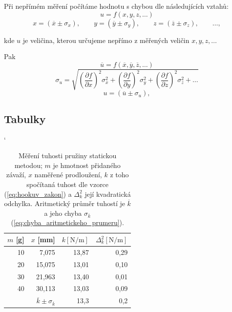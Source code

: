 \documentclass[english]{article}
\newcommand{\unit}[1]{\mathrm{#1}}
\begin{document}
	Při nepřímém měření počítáme hodnotu s chybou dle následujících vztahů:
	\begin{equation}
	u = f(x, y, z, \ldots)
	\end{equation}
	\begin{displaymath}
	x = (\overline{x} \pm \sigma_x), \qquad
	y = (\overline{y} \pm \sigma_y), \qquad
	z = (\overline{z} \pm \sigma_z), \qquad
	\ldots,
	\end{displaymath}
	
	kde $ u $ je veličina, kterou určujeme nepřímo z měřených veličin $ x, y, z, \ldots $ 
	
	Pak
	\begin{displaymath}
	\overline{u} = f(\overline{x}, \overline{y}, \overline{z}, \ldots)
	\end{displaymath}
	\begin{equation}\label{eq:chyba_neprime_mereni}
	\sigma_u = \sqrt{\left( \frac{\partial f}{\partial x} \right)^2 \sigma^2_x + \left( \frac{\partial f}{\partial y} \right)^2 \sigma^2_y + \left( \frac{\partial f}{\partial z} \right)^2 \sigma^2_z + \ldots}
	\end{equation}
	\begin{displaymath}
	u = (\overline{u} \pm \sigma_ u),
	\end{displaymath}
	
\newpage
\subsection{Tabulky}

\begin{table}[htbp]
\catcode` %
\centering
\begin{tabular}{|r|r|r|r|}
\hline
$m$ [g] & $x$ [mm] & $k \unit{[N/m]}$ & $\Delta_k^2 \unit{[N/m]}$ \\ \hline\hline
10    & 7,075 & 13,87 & 0,29 \\ \hline
20    & 15,075 & 13,01 & 0,10 \\ \hline
30    & 21,963 & 13,40 & 0,01 \\ \hline
40    & 30,113 & 13,03 & 0,09 \\ \hline 
\multicolumn{1}{r|}{}      & $\overline{k} \pm \sigma_{\overline{k}}$ & 13,3  & 0,2 \\ \cline{2-4}
\end{tabular}%
\caption{Měření tuhosti pružiny statickou metodou; $m$ je hmotnost přidaného závaží, $x$ naměřené prodloužení, $k$ z toho spočítaná tuhost dle vzorce (\ref{eq:hookuv_zakon}) a $\Delta_k^2$ její kvadratická odchylka. Aritmetický průměr tuhostí je $\overline{k}$ a jeho chyba $\sigma_{\overline{k}}$ (\ref{eq:chyba_aritmetickeho_prumeru}). }
\label{tab:lho_tuhost}%
\end{table}%
\end{document}
